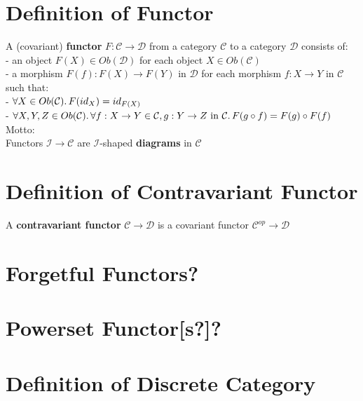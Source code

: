 \documentclass[a4paper, twoside, english, 11pt]{book}
\newcommand{\C}{\mathcal C}
\newcommand{\D}{\mathcal D}
\newcommand{\I}{\mathcal I}
\begin{document}
\section{Definition of Functor}

A (covariant) \textbf{functor} $F : \C \rightarrow \D$ from a category $\C$ to a category $\D$ consists of: \\

- an object $F(X) \in Ob(\D)$ for each object $X \in Ob(\C)$ \\

- a morphism $F(f) : F(X) \rightarrow F(Y)$ in $\D$ for each morphism $f : X \rightarrow Y$ in $\C$ \\

\noindent
such that: \\

- $\forall X \in Ob(\C) \ldotp F(id_X) = id_{F(X)}$ \\

- $\forall X, Y, Z \in Ob(\C) \ldotp \forall f : X \rightarrow Y \in \C, g : Y \rightarrow Z \text{ in } \C \ldotp F(g \circ f) = F(g) \circ F(f)$ \\

\noindent
Motto: \\
Functors $\I \rightarrow \C$ are $\I$-shaped \textbf{diagrams} in $\C$



\section{Definition of Contravariant Functor}

A \textbf{contravariant functor} $\C \rightarrow \D$ is a covariant functor $\C^{op} \rightarrow \D$



\section{Forgetful Functors?}



\section{Powerset Functor[s?]?}



\section{Definition of Discrete Category}
\end{document}
